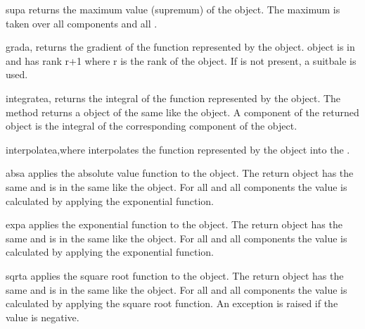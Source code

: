 \begin{funcdesc}{sup}{a}
returns the maximum value (supremum) of the object. The maximum is
taken over all components and all \DataSamplePoints .  
\end{funcdesc}

\begin{funcdesc}{grad}{a,}
returns the gradient of the function represented by the object.
\Data object is in \FunctionSpace {} and has rank r+1 where r is the rank of the object.
If  is not present, a suitbale \FunctionSpace is used. 
\end{funcdesc}

\begin{funcdesc}{integrate}{a,}
returns the integral of the function represented by the object. The method returns
a  object of the same \Shape like the object.  A
component of the returned object is the integral of the corresponding
component of the object. 
\end{funcdesc}

\begin{funcdesc}{interpolate}{a,where}
interpolates 
the function represented by the object
into the \FunctionSpace{}.
\end{funcdesc}

\begin{funcdesc}{abs}{a} 
applies the absolute value function to the object. The
return \Data object has the same \Shape and is in the same
\FunctionSpace like the object. For all \DataSamplePoints and all
components the value is calculated by applying the exponential
function. 
\end{funcdesc}

\begin{funcdesc}{exp}{a} 
applies the exponential function to the object. The
return \Data object has the same \Shape and is in the same
\FunctionSpace like the object. For all \DataSamplePoints and all
components the value is calculated by applying the exponential
function. 
\end{funcdesc}

\begin{funcdesc}{sqrt}{a}
applies the square root function to the object. The
return \Data object has the same \Shape and is in the same
\FunctionSpace like the object. For all \DataSamplePoints and all
components the value is calculated by applying the square root function. 
An exception is
raised if the value is negative.  
\end{funcdesc}

